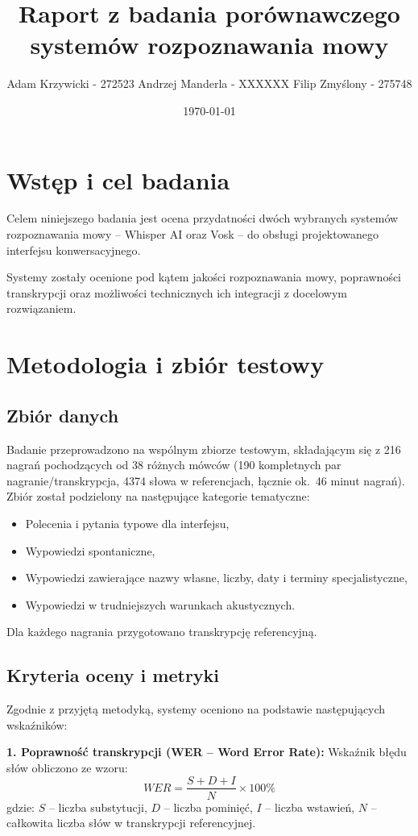 \documentclass{article}
\title{Raport z badania porównawczego systemów rozpoznawania mowy}
\author{Adam Krzywicki - 272523 Andrzej Manderla - XXXXXX Filip Zmyślony - 275748}
\date{\today}
\begin{document}
\maketitle

\section{Wstęp i cel badania}
Celem niniejszego badania jest ocena przydatności dwóch wybranych systemów rozpoznawania mowy -- Whisper AI oraz Vosk -- do obsługi projektowanego interfejsu konwersacyjnego. 

Systemy zostały ocenione pod kątem jakości rozpoznawania mowy, poprawności transkrypcji oraz możliwości technicznych ich integracji z docelowym rozwiązaniem.

\section{Metodologia i zbiór testowy}
\subsection{Zbiór danych}
Badanie przeprowadzono na wspólnym zbiorze testowym, składającym się z 216 nagrań pochodzących od 38 różnych mówców (190 kompletnych par nagranie/transkrypcja, 4374 słowa w referencjach, łącznie ok.~46 minut nagrań). Zbiór został podzielony na następujące kategorie tematyczne:
\begin{itemize}
    \item Polecenia i pytania typowe dla interfejsu,
    \item Wypowiedzi spontaniczne,
    \item Wypowiedzi zawierające nazwy własne, liczby, daty i terminy specjalistyczne,
    \item Wypowiedzi w trudniejszych warunkach akustycznych.
\end{itemize}
Dla każdego nagrania przygotowano transkrypcję referencyjną.

\subsection{Kryteria oceny i metryki}
Zgodnie z przyjętą metodyką, systemy oceniono na podstawie następujących wskaźników:

\textbf{1. Poprawność transkrypcji (WER -- Word Error Rate):}
Wskaźnik błędu słów obliczono ze wzoru:
\begin{equation}
WER = \frac{S + D + I}{N} \times 100\%
\end{equation}
gdzie: $S$ -- liczba substytucji, $D$ -- liczba pominięć, $I$ -- liczba wstawień, $N$ -- całkowita liczba słów w transkrypcji referencyjnej.
\end{document}
